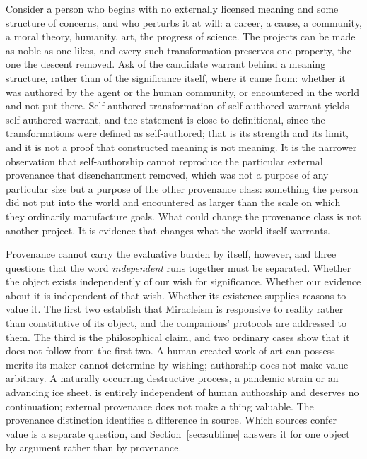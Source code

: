 Consider a person who begins with no externally licensed meaning and some
structure of concerns, and who perturbs it at will: a career, a cause, a
community, a moral theory, humanity, art, the progress of science. The
projects can be made as noble as one likes, and every such transformation
preserves one property, the one the descent removed. Ask of the candidate
warrant behind a meaning structure, rather than of the significance itself,
where it came from: whether it was authored by the agent or the human
community, or encountered in the world and not put there. Self-authored
transformation of self-authored warrant yields self-authored warrant, and the
statement is close to definitional, since the transformations were defined as
self-authored; that is its strength and its limit, and it is not a proof that
constructed meaning is not meaning. It
is the narrower observation that self-authorship cannot reproduce the
particular external provenance that disenchantment removed, which was not a
purpose of any particular size but a purpose of the other provenance class:
something the person did not put into the world and encountered as larger than
the scale on which they ordinarily manufacture goals. What could change the
provenance class is not another project. It is evidence that changes what the
world itself warrants.

Provenance cannot carry the evaluative burden by itself, however, and three
questions that the word \emph{independent} runs together must be separated.
Whether the object exists independently of our wish for significance. Whether
our evidence about it is independent of that wish. Whether its existence
supplies reasons to value it. The first two establish that Miracleism is
responsive to reality rather than constitutive of its object, and the
companions' protocols are addressed to them. The third is the philosophical
claim, and two ordinary cases show that it does not follow from the first
two. A human-created work of art can possess merits its maker cannot determine
by wishing; authorship does not make value arbitrary. A naturally occurring
destructive process, a pandemic strain or an advancing ice sheet, is entirely
independent of human authorship and deserves no continuation; external
provenance does not make a thing valuable. The provenance distinction
identifies a difference in source. Which sources confer value is a separate
question, and Section~\ref{sec:sublime} answers it for one object by argument
rather than by provenance.

